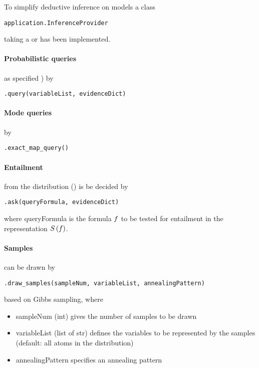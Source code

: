 
To simplify deductive inference on models a class
\begin{lstlisting}
application.InferenceProvider
\end{lstlisting}
taking a  or  has been implemented.


\paragraph{Probabilistic queries} as specified )  by
\begin{lstlisting}
.query(variableList, evidenceDict)
\end{lstlisting}

\paragraph{Mode queries} by
\begin{lstlisting}
.exact_map_query()
\end{lstlisting}


\paragraph{Entailment} from the distribution () is be decided by
\begin{lstlisting}
.ask(queryFormula, evidenceDict)
\end{lstlisting}
where queryFormula is the formula $f$ to be tested for entailment in the representation $S\left(f\right)$.


\paragraph{Samples} can be drawn by
\begin{lstlisting}
.draw_samples(sampleNum, variableList, annealingPattern)
\end{lstlisting}
based on Gibbs sampling, where
\begin{itemize}
    \item sampleNum (int) gives the number of samples to be drawn
    \item variableList (list of str) defines the variables to be represented by the samples (default: all atoms in the distribution)
    \item annealingPattern specifies an annealing pattern
\end{itemize}


